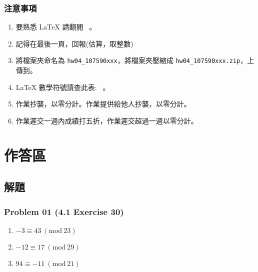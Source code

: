\documentclass[14pt,hyperref={bookmarks=false}]{beamer}
\begin{document}
	\begin{frame}
	\frametitle{注意事項}
	\fontsize{10}{10pt}\selectfont
	\begin{enumerate}[label=(\alph*)]
	\item 要熟悉 LaTeX 請翻閱 \ 。
	\item 記得在最後一頁，回報\selectfont \color{red}{完成作業小時數}(估算，取整數)\selectfont \color{black}{。}
	\item 將檔案夾命名為 \texttt{hw04\_107590xxx}，將檔案夾壓縮成 \texttt{hw04\_107590xxx.zip}，上傳到。
	\item LaTeX 數學符號請查此表: \ 。
	\item 作業抄襲，以零分計。作業提供給他人抄襲，以零分計。
	\item 作業遲交一週內成績打五折，作業遲交超過一週以零分計。
	\end{enumerate}
	\end{frame}

\section{作答區}

	\subsection{解題}
	
	\begin{frame}
	\frametitle{Problem 01 (4.1 Exercise 30)}
	\fontsize{10}{10pt}\selectfont
	\begin{enumerate}[label=(\alph*)]
	\item $-3 \equiv 43~ (\text{mod}~ 23) $
	\item $-12 \equiv 17~ (\text{mod}~ 29) $
	\item $94 \equiv -11~ (\text{mod}~ 21) $
	\end{enumerate}
	\end{frame}
	
\end{document}
